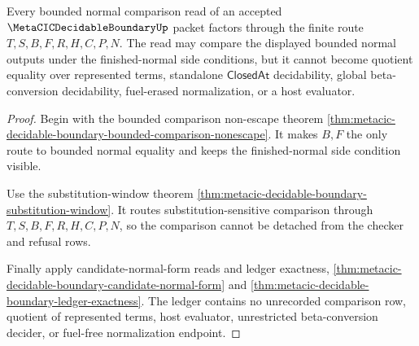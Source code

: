 \begin{theorem}
\label{thm:metacic-decidable-boundary-bounded-normal-comparison-scope}
Every bounded normal comparison read of an accepted $\MetaCICDecidableBoundaryUp$ packet factors through the finite route $T,S,B,F,R,H,C,P,N$. The read may compare the displayed bounded normal outputs under the finished-normal side conditions, but it cannot become quotient equality over represented terms, standalone $\mathsf{ClosedAt}$ decidability, global beta-conversion decidability, fuel-erased normalization, or a host evaluator.
\end{theorem}
\begin{proof}
Begin with the bounded comparison non-escape theorem \autoref{thm:metacic-decidable-boundary-bounded-comparison-nonescape}. It makes $B,F$ the only route to bounded normal equality and keeps the finished-normal side condition visible.

Use the substitution-window theorem \autoref{thm:metacic-decidable-boundary-substitution-window}. It routes substitution-sensitive comparison through $T,S,B,F,R,H,C,P,N$, so the comparison cannot be detached from the checker and refusal rows.

Finally apply candidate-normal-form reads and ledger exactness, \autoref{thm:metacic-decidable-boundary-candidate-normal-form} and \autoref{thm:metacic-decidable-boundary-ledger-exactness}. The ledger contains no unrecorded comparison row, quotient of represented terms, host evaluator, unrestricted beta-conversion decider, or fuel-free normalization endpoint.
\end{proof}


